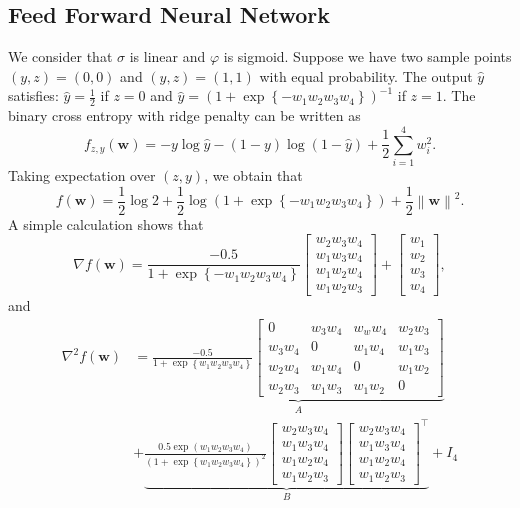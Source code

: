 \documentclass{article}
\newcommand{\Norm}[1]{\left\|#1\right\|}
\newcommand{\paren}[1]{\left( #1 \right)}
\newcommand{\bw}{\mathbf{w}}
\begin{document}
\subsection{Feed Forward Neural Network}
We consider that $\sigma$ is linear and $\varphi$ is sigmoid. Suppose we have two sample points $(y,z)=(0,0)$ and $(y,z)=(1,1)$ with equal probability. The output $\hat{y}$ satisfies: $\hat{y}=\frac{1}{2}$ if $z=0$ and $\hat{y}=\paren{1+\exp\left\{-w_1w_2w_3w_4\right\}}^{-1}$ if $z=1$.
The binary cross entropy with ridge penalty can be written as
$$f_{z,y}(\bw)=-y\log\hat{y}-(1-y)\log\paren{1-\hat{y}}+\frac{1}{2}\sum_{i=1}^4 w_i^2.$$
Taking expectation over $(z,y)$, we obtain that
$$f(\bw)=\frac{1}{2}\log 2+\frac{1}{2}\log\paren{1+\exp\left\{-w_1w_2w_3w_4\right\}}+\frac{1}{2}\Norm{\bw}^2.$$
A simple calculation shows that
$$\nabla f(\bw)=\frac{-0.5}{1+\exp\left\{-w_1w_2w_3w_4\right\}}\left[\begin{array}{c}
     w_2w_3w_4  \\
     w_1w_3w_4  \\
     w_1w_2w_4  \\
     w_1w_2w_3  
\end{array}\right]+\left[\begin{array}{c}
     w_1  \\
     w_2  \\
     w_3  \\
     w_4  
\end{array}\right],$$
and
\begin{equation}\nonumber
       \begin{aligned}
\nabla^2 f(\bw) & =\underbrace{\frac{-0.5}{1+\exp \left\{w_1w_2w_3w_4\right\}}\left[\begin{array}{cccc}
0 & w_3w_4 & w_w w_4 & w_2 w_3 \\
w_3 w_4 & 0 & w_1 w_4 & w_1 w_3 \\
w_2 w_4 & w_1 w_4 & 0 & w_1 w_2 \\
w_2 w_3 & w_1 w_3 & w_1 w_2 & 0
\end{array}\right]}_{A} \\
& +\underbrace{\frac{0.5 \exp \left(w_1w_2w_3w_4\right)}{\left(1+\exp \left\{w_1w_2w_3w_4\right\}\right)^2}\left[\begin{array}{l}
w_2w_3w_4\\
w_1w_3w_4 \\
w_1w_2w_4 \\
w_1w_2w_3
\end{array}\right]\left[\begin{array}{l}
w_2w_3w_4\\
w_1w_3w_4 \\
w_1w_2w_4 \\
w_1w_2w_3
\end{array}\right]^\top}_{B}+I_4
\end{aligned}
\end{equation}
\end{document}
